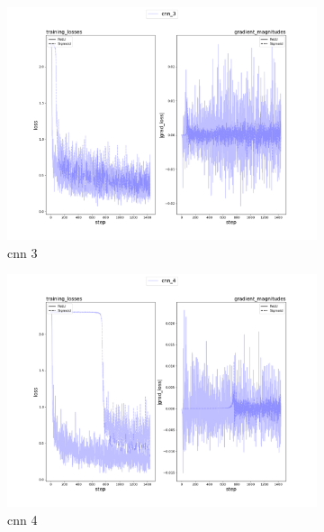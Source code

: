 \documentclass{assignment}
\begin{document}
\begin{figure}[htbp!]
\begin{subfigure}{0.3\textwidth}
        \includegraphics[width=\textwidth]{figures/part4_alpha_cnn_3.png}
        \caption{cnn 3}
    \end{subfigure}
    \hfill
    \begin{subfigure}{0.3\textwidth}
        \includegraphics[width=\textwidth]{figures/part4_alpha_cnn_4.png}
        \caption{cnn 4}
    \end{subfigure}\hfill
    \begin{subfigure}{0.3\textwidth}

\end{subfigure}
\end{figure}
\end{document}
